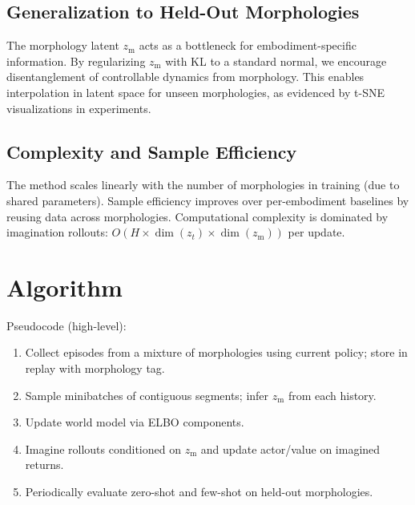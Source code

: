 \documentclass{article}
\begin{document}
\subsection{Generalization to Held-Out Morphologies}
The morphology latent $z_{\mathrm{m}}$ acts as a bottleneck for embodiment-specific information. By regularizing $z_{\mathrm{m}}$ with KL to a standard normal, we encourage disentanglement of controllable dynamics from morphology. This enables interpolation in latent space for unseen morphologies, as evidenced by t-SNE visualizations in experiments.

\subsection{Complexity and Sample Efficiency}
The method scales linearly with the number of morphologies in training (due to shared parameters). Sample efficiency improves over per-embodiment baselines by reusing data across morphologies. Computational complexity is dominated by imagination rollouts: $O(H \times \dim(z_t) \times \dim(z_{\mathrm{m}}))$ per update.

\section{Algorithm}
Pseudocode (high-level):
\begin{enumerate}
\item Collect episodes from a mixture of morphologies using current policy; store in replay with morphology tag.
\item Sample minibatches of contiguous segments; infer $z_{\mathrm{m}}$ from each history.
\item Update world model via ELBO components.
\item Imagine rollouts conditioned on $z_{\mathrm{m}}$ and update actor/value on imagined returns.
\item Periodically evaluate zero-shot and few-shot on held-out morphologies.
\end{enumerate}
\end{document}
